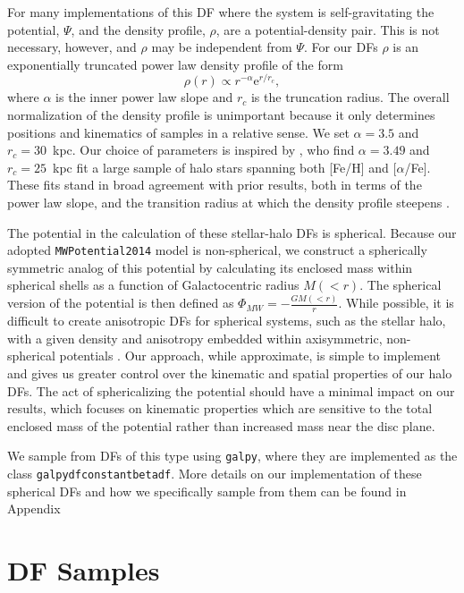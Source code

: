 For many implementations of this DF where the system is self-gravitating the potential, $\Psi$, and the density profile, $\rho$, are a potential-density pair. This is not necessary, however, and $\rho$ may be independent from $\Psi$. For our DFs $\rho$ is an exponentially truncated power law density profile of the form
\begin{equation}
    \rho(r) \propto r^{-\alpha}\mathrm{e}^{r/r_{c}},
\end{equation}
where $\alpha$ is the inner power law slope and $r_{c}$ is the truncation radius. The overall normalization of the density profile is unimportant because it only determines positions and kinematics of samples in a relative sense. We set $\alpha=3.5$ and $r_{c}=30$~kpc. Our choice of parameters is inspired by \textcite{mackereth20}, who find $\alpha=3.49$ and $r_{c}=25$~kpc fit a large sample of halo stars spanning both [Fe/H] and [$\alpha$/Fe]. These fits stand in broad agreement with prior results, both in terms of the power law slope, and the transition radius at which the density profile steepens \parencite{deason11,xue15,iorio18}.

The potential in the calculation of these stellar-halo DFs is spherical. Because our adopted \texttt{MWPotential2014} model is non-spherical, we construct a spherically symmetric analog of this potential by calculating its enclosed mass within spherical shells as a function of Galactocentric radius $M(<r)$. The spherical version of the potential is then defined as $\Phi_{MW} = -\frac{GM(<r)}{r}$. While possible, it is difficult to create anisotropic DFs for spherical systems, such as the stellar halo, with a given density and anisotropy embedded within axisymmetric, non-spherical potentials \parencite{posti15,williams15}. Our approach, while approximate, is simple to implement and gives us greater control over the kinematic and spatial properties of our halo DFs. The act of sphericalizing the potential should have a minimal impact on our results, which focuses on kinematic properties which are sensitive to the total enclosed mass of the potential rather than increased mass near the disc plane. 

We sample from DFs of this type using \texttt{galpy}, where they are implemented as the class \texttt{galpydfconstantbetadf}. More details on our implementation of these spherical DFs and how we specifically sample from them can be found in Appendix %

\section{DF Samples}
\label{sec:DFSamples}

